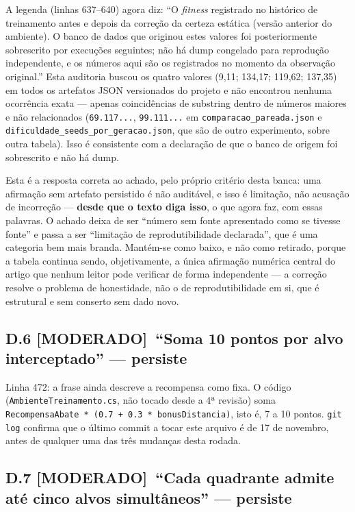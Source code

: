 \documentclass[11pt,a4paper]{article}
\newcommand{\moderado}{\textbf{\color{blue!50!black}[MODERADO]}}
\begin{document}
A legenda (linhas 637--640) agora diz: ``O \textit{fitness} registrado no histórico de treinamento
antes e depois da correção da certeza estática (versão anterior do ambiente). O banco de dados que
originou estes valores foi posteriormente sobrescrito por execuções seguintes; não há dump congelado
para reprodução independente, e os números aqui são os registrados no momento da observação
original.'' Esta auditoria buscou os quatro valores (9,11; 134,17; 119,62; 137,35) em todos os
artefatos JSON versionados do projeto e não encontrou nenhuma ocorrência exata --- apenas coincidências
de substring dentro de números maiores e não relacionados (\texttt{69.117...},
\texttt{99.111...} em \texttt{comparacao\_pareada.json} e \texttt{dificuldade\_seeds\_por\_geracao.json},
que são de outro experimento, sobre outra tabela). Isso é consistente com a declaração de que o banco
de origem foi sobrescrito e não há dump.

Esta é a resposta correta ao achado, pelo próprio critério desta banca: uma afirmação sem artefato
persistido é não auditável, e isso é limitação, não acusação de incorreção --- \textbf{desde que o
texto diga isso}, o que agora faz, com essas palavras. O achado deixa de ser ``número sem fonte
apresentado como se tivesse fonte'' e passa a ser ``limitação de reprodutibilidade declarada'', que é
uma categoria bem mais branda. Mantém-se como baixo, e não como retirado, porque a tabela continua
sendo, objetivamente, a única afirmação numérica central do artigo que nenhum leitor pode verificar de
forma independente --- a correção resolve o problema de honestidade, não o de reprodutibilidade em si,
que é estrutural e sem conserto sem dado novo.

\subsection*{D.6 \moderado\ ``Soma 10 pontos por alvo interceptado'' --- persiste}

Linha 472: a frase ainda descreve a recompensa como fixa. O código
(\texttt{AmbienteTreinamento.cs}, não tocado desde a 4ª revisão) soma
\texttt{RecompensaAbate * (0.7 + 0.3 * bonusDistancia)}, isto é, 7 a 10 pontos. \texttt{git log}
confirma que o último commit a tocar este arquivo é de 17 de novembro, antes de qualquer uma das três
mudanças desta rodada.

\subsection*{D.7 \moderado\ ``Cada quadrante admite até cinco alvos simultâneos'' --- persiste}
\end{document}
